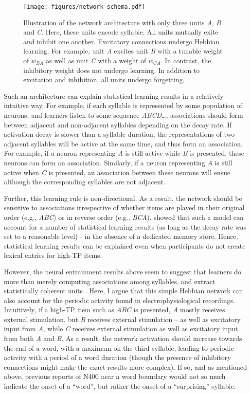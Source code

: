 \documentclass[
]{article}
\begin{document}
\begin{figure}
\centering
\texttt{[image: figures/network\_schema.pdf]}
\caption{Illustration of the network architecture with only three units
\emph{A}, \emph{B} and \emph{C}. Here, these units encode syllable. All
units mutually exite and inhibit one another. Excitatory connections
undergo Hebbian learning. For example, unit \emph{A} excites unit
\emph{B} with a tunable weight of \(w_{BA}\) as well as unit \emph{C}
with a weight of \(w_{CA}\). In contrast, the inhibitory weight does not
undergo learning. In addition to excitation and inhibition, all units
undergo forgetting.}
\end{figure}

Such an architecture can explain statistical learning results in a
relatively intuitive way. For example, if each syllable is represented
by some population of neurons, and learners listen to some sequence
\emph{ABCD}\ldots, associations should form between adjacent and
non-adjacent syllables depending on the decay rate. If activation decay
is slower than a syllable duration, the representations of two adjacent
syllables will be active at the same time, and thus form an association.
For example, if a neuron representing \emph{A} is still active while
\emph{B} is presented, these neurons can form an association. Similarly,
if a neuron representing \emph{A} is still active when \emph{C} is
presented, an association between these neurons will ensue although the
corresponding syllables are not adjacent.

Further, this learning rule is non-directional. As a result, the network
should be sensitive to associations irrespective of whether items are
played in their original order (e.g., \emph{ABC}) or in reverse order
(e.g., \emph{BCA}). \citep{Endress-TP-Model} showed that such a model
can account for a number of statistical learning results (as long as the
decay rate was set to a reasonable level) - in the absence of a
dedicated memory store. Hence, statistical learning results can be
explained even when participants do not create lexical entries for
high-TP items.

However, the neural entrainment results above seem to suggest that
learners do more than merely computing associations among syllables, and
extract statistically coherent units
\citep{Batterink2017, Flo2022, Sanders2002, Teinonen2009}. Here, I argue
that this simple Hebbian network can also account for the periodic
activity found in electrophysiological recordings. Intuitively, if a
high-TP item such as \emph{ABC} is presented, \emph{A} mostly receives
external stimulation, but \emph{B} receives external stimulation -- as
well as excitatory input from \emph{A}, while \emph{C} receives external
stimulation as well as excitatory input from both \emph{A} and \emph{B}.
As a result, the network activation should increase towards the end of a
word, with a maximum on the third syllable, leading to periodic activity
with a period of a word duration (though the presence of inhibitory
connections might make the exact results more complex). If so, and as
mentioned above, previous reports of N400 near a word boundary would not
so much indicate the onset of a ``word'', but rather the onset of a
``surprising'' syllable.
\end{document}
